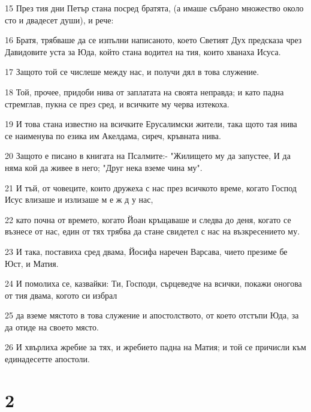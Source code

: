 \par 15 През тия дни Петър стана посред братята, (а имаше събрано множество около сто и двадесет души), и рече:
\par 16 Братя, трябваше да се изпълни написаното, което Светият Дух предсказа чрез Давидовите уста за Юда, който стана водител на тия, които хванаха Исуса.
\par 17 Защото той се числеше между нас, и получи дял в това служение.
\par 18 Той, прочее, придоби нива от заплатата на своята неправда; и като падна стремглав, пукна се през сред, и всичките му черва изтекоха.
\par 19 И това стана известно на всичките Ерусалимски жители, така щото тая нива се наименува по езика им Акелдама, сиреч, кръвната нива.
\par 20 Защото е писано в книгата на Псалмите:- "Жилището му да запустее, И да няма кой да живее в него; "Друг нека вземе чина му".
\par 21 И тъй, от човеците, които дружеха с нас през всичкото време, когато Господ Исус влизаше и излизаше м е ж д у нас,
\par 22 като почна от времето, когато Йоан кръщаваше и следва до деня, когато се възнесе от нас, един от тях трябва да стане свидетел с нас на възкресението му.
\par 23 И така, поставиха сред двама, Йосифа наречен Варсава, чието презиме бе Юст, и Матия.
\par 24 И помолиха се, казвайки: Ти, Господи, сърцеведче на всички, покажи оногова от тия двама, когото си избрал
\par 25 да вземе мястото в това служение и апостолството, от което отстъпи Юда, за да отиде на своето място.
\par 26 И хвърлиха жребие за тях, и жребието падна на Матия; и той се причисли към единадесетте апостоли.

\chapter{2}

